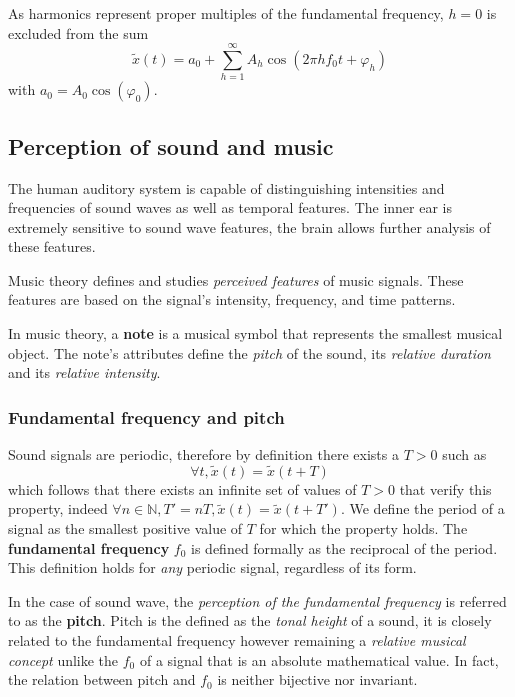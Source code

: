 \documentclass[
  american,
]{article}
\begin{document}
As harmonics represent proper multiples of the fundamental
frequency, \(h=0\) is excluded from the sum
\[\tilde{x}(t) = a_0 + \sum_{h=1}^{\infty} A_h \cos(2\pi hf_0t + \varphi_h)\]
with \(a_0 = A_0\cos(\varphi_0)\).

\hypertarget{perception-of-sound-and-music}{%
\subsection{Perception of sound and music}\label{perception-of-sound-and-music}}

The human auditory system is capable of distinguishing
intensities and frequencies of sound waves as well as
temporal features.
The inner ear is extremely sensitive to sound wave features,
the brain allows further analysis of these features.

Music theory defines and studies \emph{perceived features}
of music signals.
These features are based on the signal's intensity,
frequency, and time patterns.

In music theory, a \textbf{note} is a musical symbol that
represents the smallest musical object.
The note's attributes define the \emph{pitch} of the sound, its
\emph{relative duration} and its \emph{relative intensity}.

\hypertarget{fundamental-frequency-and-pitch}{%
\subsubsection{Fundamental frequency and pitch}\label{fundamental-frequency-and-pitch}}

Sound signals are periodic, therefore by definition there
exists a \(T>0\) such as
\[\forall t, \tilde{x}(t)=\tilde{x}(t+T)\]
which follows that there exists an infinite set of values of \(T>0\) that verify this property, indeed
\(\forall n\in\mathbb{N}, T'=nT, \tilde{x}(t)=\tilde{x}(t+T')\).
We define the period of a signal as the smallest positive
value of \(T\) for which the property holds.
The \textbf{fundamental frequency} \(f_0\) is defined formally
as the reciprocal of the period.
This definition holds for \emph{any} periodic signal,
regardless of its form.

In the case of sound wave, the \emph{perception of the fundamental
frequency} is referred to as the \textbf{pitch}.
Pitch is the defined as the \emph{tonal height} of a sound,
it is closely related to the fundamental frequency
however remaining a \emph{relative musical concept}
unlike the \(f_0\) of a signal that is an absolute
mathematical value.
In fact, the relation between pitch and \(f_0\)
is neither bijective nor invariant.
\end{document}
